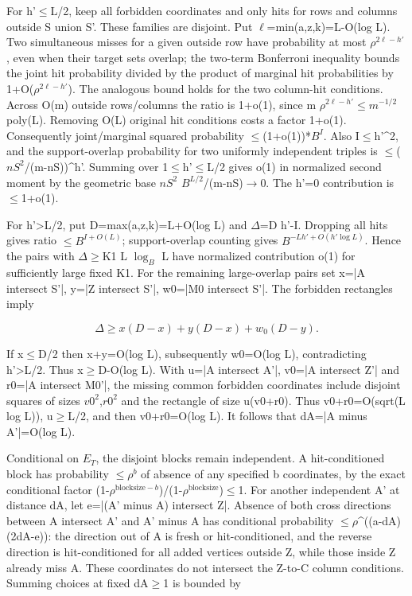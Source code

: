 \documentclass[11pt]{article}
\begin{document}
For h'\ensuremath{\leq}L/2, keep all forbidden coordinates and only hits for rows and columns outside S union S'. These families are disjoint. Put $\ell$=min(a,z,k)=L-O(log L). Two simultaneous misses for a given outside row have probability at most $\rho^{2\ell-h'}$, even when their target sets overlap; the two-term Bonferroni inequality bounds the joint hit probability divided by the product of marginal hit probabilities by 1+O($\rho^{2\ell-h'}$). The analogous bound holds for the two column-hit conditions. Across O(m) outside rows/columns the ratio is 1+o(1), since m $\rho^{2\ell-h'}$\ensuremath{\leq}$m^{-1/2}$ poly(L). Removing O(L) original hit conditions costs a factor 1+o(1). Consequently joint/marginal squared probability \ensuremath{\leq}(1+o(1))*$B^{I}$. Also I\ensuremath{\leq}h'\textasciicircum{}2, and the support-overlap probability for two uniformly independent triples is \ensuremath{\leq}($nS^{2}$/(m-nS))\textasciicircum{}h'. Summing over 1\ensuremath{\leq}h'\ensuremath{\leq}L/2 gives o(1) in normalized second moment by the geometric base $nS^{2}$ $B^{L/2}$/(m-nS)\ensuremath{\to}0. The h'=0 contribution is \ensuremath{\leq}1+o(1).

For h'>L/2, put D=max(a,z,k)=L+O(log L) and $\Delta$=D h'-I. Dropping all hits gives ratio \ensuremath{\leq}$B^{I+O(L)}$; support-overlap counting gives $B^{-Lh'+O(h'\log L)}$. Hence the pairs with $\Delta$\ensuremath{\geq}K1 L $\log_B$ L have normalized contribution o(1) for sufficiently large fixed K1. For the remaining large-overlap pairs set x=|A intersect S'|, y=|Z intersect S'|, w0=|M0 intersect S'|. The forbidden rectangles imply

\[
\Delta\geq x(D-x)+y(D-x)+w_0(D-y).
\]

If x\ensuremath{\leq}D/2 then x+y=O(log L), subsequently w0=O(log L), contradicting h'>L/2. Thus x\ensuremath{\geq}D-O(log L). With u=|A intersect A'|, v0=|A intersect Z'| and r0=|A intersect M0'|, the missing common forbidden coordinates include disjoint squares of sizes $v0^{2}$,$r0^{2}$ and the rectangle of size u(v0+r0). Thus v0+r0=O(sqrt(L log L)), u\ensuremath{\geq}L/2, and then v0+r0=O(log L). It follows that dA=|A minus A'|=O(log L).

Conditional on $E_T$, the disjoint blocks remain independent. A hit-conditioned block has probability \ensuremath{\leq}$\rho^{b}$ of absence of any specified b coordinates, by the exact conditional factor (1-$\rho^{\mathrm{blocksize}-b}$)/(1-$\rho^{\mathrm{blocksize}}$)\ensuremath{\leq}1. For another independent A' at distance dA, let e=|(A' minus A) intersect Z|. Absence of both cross directions between A intersect A' and A' minus A has conditional probability \ensuremath{\leq}$\rho$\textasciicircum{}((a-dA)(2dA-e)): the direction out of A is fresh or hit-conditioned, and the reverse direction is hit-conditioned for all added vertices outside Z, while those inside Z already miss A. These coordinates do not intersect the Z-to-C column conditions. Summing choices at fixed dA\ensuremath{\geq}1 is bounded by
\end{document}
